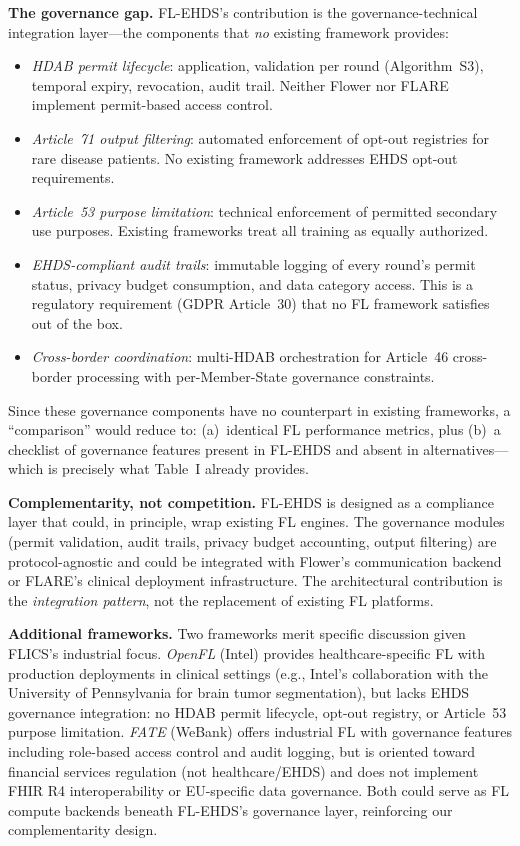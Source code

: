 \documentclass[conference]{IEEEtran}
\begin{document}
\textbf{The governance gap.} FL-EHDS's contribution is the governance-technical integration layer---the components that \textit{no} existing framework provides:
\begin{itemize}
    \item \textit{HDAB permit lifecycle}: application, validation per round (Algorithm~S3), temporal expiry, revocation, audit trail. Neither Flower nor FLARE implement permit-based access control.
    \item \textit{Article~71 output filtering}: automated enforcement of opt-out registries for rare disease patients. No existing framework addresses EHDS opt-out requirements.
    \item \textit{Article~53 purpose limitation}: technical enforcement of permitted secondary use purposes. Existing frameworks treat all training as equally authorized.
    \item \textit{EHDS-compliant audit trails}: immutable logging of every round's permit status, privacy budget consumption, and data category access. This is a regulatory requirement (GDPR Article~30) that no FL framework satisfies out of the box.
    \item \textit{Cross-border coordination}: multi-HDAB orchestration for Article~46 cross-border processing with per-Member-State governance constraints.
\end{itemize}

Since these governance components have no counterpart in existing frameworks, a ``comparison'' would reduce to: (a)~identical FL performance metrics, plus (b)~a checklist of governance features present in FL-EHDS and absent in alternatives---which is precisely what Table~I already provides.

\textbf{Complementarity, not competition.} FL-EHDS is designed as a compliance layer that could, in principle, wrap existing FL engines. The governance modules (permit validation, audit trails, privacy budget accounting, output filtering) are protocol-agnostic and could be integrated with Flower's communication backend or FLARE's clinical deployment infrastructure. The architectural contribution is the \textit{integration pattern}, not the replacement of existing FL platforms.

\textbf{Additional frameworks.} Two frameworks merit specific discussion given FLICS's industrial focus. \textit{OpenFL} (Intel) provides healthcare-specific FL with production deployments in clinical settings (e.g., Intel's collaboration with the University of Pennsylvania for brain tumor segmentation), but lacks EHDS governance integration: no HDAB permit lifecycle, opt-out registry, or Article~53 purpose limitation. \textit{FATE} (WeBank) offers industrial FL with governance features including role-based access control and audit logging, but is oriented toward financial services regulation (not healthcare/EHDS) and does not implement FHIR R4 interoperability or EU-specific data governance. Both could serve as FL compute backends beneath FL-EHDS's governance layer, reinforcing our complementarity design.
\end{document}
